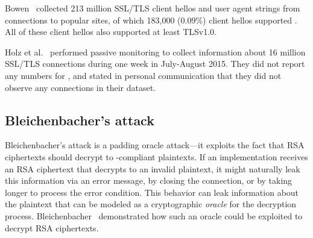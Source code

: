 Bowen~\cite{cab-forum-sslv2} collected 213 million SSL/TLS client hellos and
user agent strings from connections to popular sites, of which 183,000
(0.09\%) client hellos supported \ssltwo. All of these client hellos also
supported at least TLSv1.0.

Holz et al.~\cite{mail-tls-holz-2016} performed passive monitoring to collect
information about 16 million SSL/TLS connections during one week in
July-August 2015. They did not report any numbers for \ssltwo, and stated in
personal communication that they did not observe any \ssltwo connections in
their dataset.



\subsection{Bleichenbacher's attack}
\label{sec:bleichenbacher}
Bleichenbacher's attack is a padding oracle attack---it exploits the fact
that RSA ciphertexts should decrypt to \PKCS-compliant plaintexts. If an
implementation receives an RSA ciphertext that decrypts to an invalid \PKCS
plaintext, it might naturally leak this information via an error message, by
closing the connection, or by taking longer to process the error condition.
This behavior can leak information about the plaintext that can be modeled as
a cryptographic \textit{oracle} for the decryption process.
Bleichenbacher~\cite{bleichenbacher-1998} demonstrated how such an oracle
could be exploited to decrypt RSA ciphertexts.


